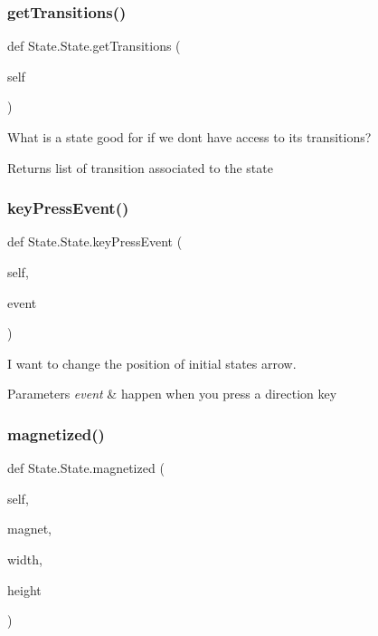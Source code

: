 \subsubsection{\texorpdfstring{getTransitions()}{getTransitions()}}
{\footnotesize\ttfamily def State.\+State.\+get\+Transitions (\begin{DoxyParamCaption}\item[{}]{self }\end{DoxyParamCaption})}



What is a state good for if we don\textquotesingle{}t have access to its transitions? 

\begin{DoxyReturn}{Returns}
list of transition associated to the state 
\end{DoxyReturn}
\mbox{\label{classState_1_1State_a3a1fbc7eb7a9c27535d972c532a17844}} 
\subsubsection{\texorpdfstring{keyPressEvent()}{keyPressEvent()}}
{\footnotesize\ttfamily def State.\+State.\+key\+Press\+Event (\begin{DoxyParamCaption}\item[{}]{self,  }\item[{}]{event }\end{DoxyParamCaption})}



I want to change the position of initial state\textquotesingle{}s arrow. 


\begin{DoxyParams}{Parameters}
{\em event} & happen when you press a direction key \\
\hline
\end{DoxyParams}
\mbox{\label{classState_1_1State_af8dae223eec1344656a82451fb7fdd98}} 
\subsubsection{\texorpdfstring{magnetized()}{magnetized()}}
{\footnotesize\ttfamily def State.\+State.\+magnetized (\begin{DoxyParamCaption}\item[{}]{self,  }\item[{}]{magnet,  }\item[{}]{width,  }\item[{}]{height }\end{DoxyParamCaption})}



